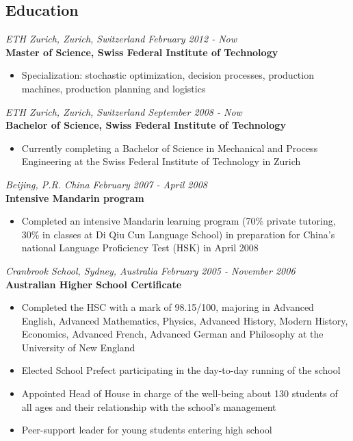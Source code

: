 \documentclass[margin]{res}
\begin{document}
\begin{resume}
\section{Education}
  {\it ETH Zurich, Zurich, Switzerland \hfill February 2012 - Now} \\
  {\bf Master of Science, Swiss Federal Institute of Technology}
  \begin{itemize} \itemsep -0.5pt 
  \item Specialization: stochastic optimization, decision processes, production machines, production planning and logistics
  \end{itemize}
  {\it ETH Zurich, Zurich, Switzerland \hfill September 2008 - Now} \\
  {\bf Bachelor of Science, Swiss Federal Institute of Technology}
  \begin{itemize} \itemsep -0.5pt 
  \item Currently completing a Bachelor of Science in Mechanical and Process Engineering at the Swiss Federal Institute of Technology in Zurich
  \end{itemize}
  {\it Beijing, P.R. China \hfill February 2007 - April 2008} \\
  {\bf Intensive Mandarin program}
  \begin{itemize} \itemsep -0.5pt 
  \item Completed an intensive Mandarin learning program (70\% private tutoring, 30\% in classes at Di Qiu Cun Language School) in preparation for China’s national Language Proficiency Test (HSK) in April 2008
  \end{itemize}
  {\it Cranbrook School, Sydney, Australia \hfill February 2005 - November 2006} \\
  {\bf Australian Higher School Certificate}
  \begin{itemize} \itemsep -0.5pt 
  \item Completed the HSC with a mark of 98.15/100, majoring in Advanced English, Advanced Mathematics, Physics, Advanced History, Modern History, Economics, Advanced French, Advanced German and Philosophy at the University of New England
  \item Elected School Prefect participating in the day-to-day running of the school
  \item Appointed Head of House in charge of the well-being about 130 students of all ages 
and their relationship with the school’s management
  \item Peer-support leader for young students entering high school

\end{itemize}
\end{resume}
\end{document}
